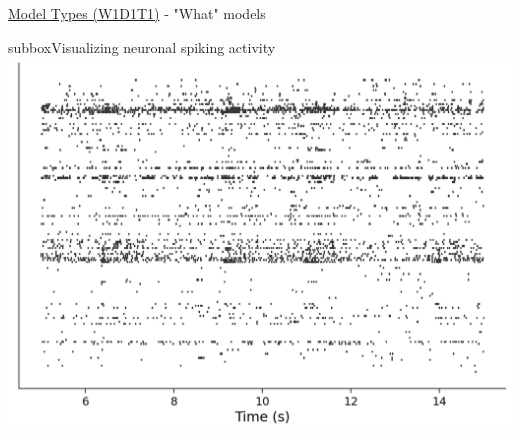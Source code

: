\begin{textbox}{\href{https://compneuro.neuromatch.io/tutorials/W1D1_ModelTypes/student/W1D1_Tutorial1.html}{Model Types (W1D1T1)} -  "What" models}
\begin{subbox}{subbox}{Visualizing neuronal spiking activity}
\centering
\includegraphics[scale=0.3]{Figures/MT/MT_Figure2.png}
\end{subbox}
\end{textbox}
